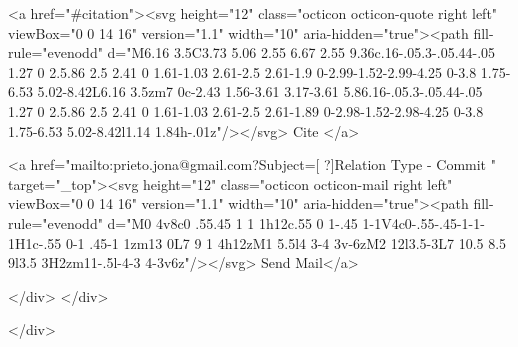       <a  href="#citation"><svg height="12" class="octicon octicon-quote right left" viewBox="0 0 14 16" version="1.1" width="10" aria-hidden="true"><path fill-rule="evenodd" d="M6.16 3.5C3.73 5.06 2.55 6.67 2.55 9.36c.16-.05.3-.05.44-.05 1.27 0 2.5.86 2.5 2.41 0 1.61-1.03 2.61-2.5 2.61-1.9 0-2.99-1.52-2.99-4.25 0-3.8 1.75-6.53 5.02-8.42L6.16 3.5zm7 0c-2.43 1.56-3.61 3.17-3.61 5.86.16-.05.3-.05.44-.05 1.27 0 2.5.86 2.5 2.41 0 1.61-1.03 2.61-2.5 2.61-1.89 0-2.98-1.52-2.98-4.25 0-3.8 1.75-6.53 5.02-8.42l1.14 1.84h-.01z"/></svg> Cite
      </a>

      <a href="mailto:prieto.jona@gmail.com?Subject=[ ?]Relation Type - Commit " target="_top"><svg height="12" class="octicon octicon-mail right left" viewBox="0 0 14 16" version="1.1" width="10" aria-hidden="true"><path fill-rule="evenodd" d="M0 4v8c0 .55.45 1 1 1h12c.55 0 1-.45 1-1V4c0-.55-.45-1-1-1H1c-.55 0-1 .45-1 1zm13 0L7 9 1 4h12zM1 5.5l4 3-4 3v-6zM2 12l3.5-3L7 10.5 8.5 9l3.5 3H2zm11-.5l-4-3 4-3v6z"/></svg> Send Mail</a>

    </div>
  </div>

</div>




